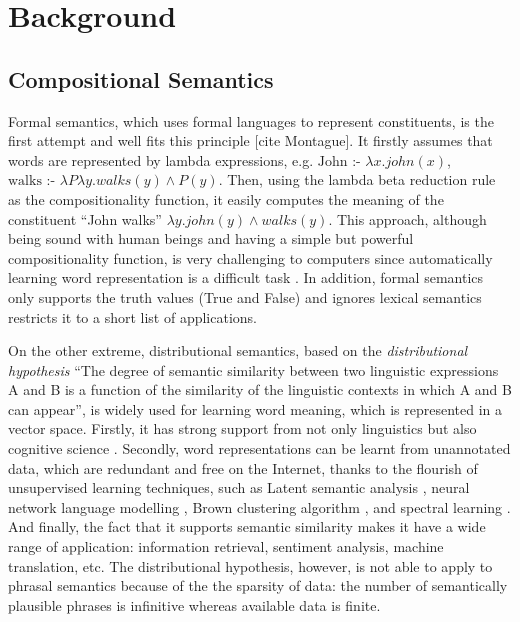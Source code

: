 \documentclass[11pt]{article}
\begin{document}

\section{Background}
\label{section background}

\subsection{Compositional Semantics}

Formal semantics, which uses formal languages to represent constituents, 
is the first attempt and well fits this principle [cite Montague].
It firstly assumes that 
words are represented by lambda expressions, e.g. $\text{John :- } \lambda x.john(x)$,
$\text{walks :- } \lambda P \lambda y. walks(y) \wedge P(y)$. Then, using  
the lambda beta reduction rule as the compositionality function, it easily  
computes the meaning of the constituent ``John walks'' 
$\lambda y. john(y) \wedge walks(y)$. 
This approach, although being sound with human beings and having a simple but 
powerful compositionality function, is very 
challenging to computers since automatically learning word representation 
is a difficult task \cite{DBLP:conf/coling/LeZ12}. 
In addition, formal semantics only supports the truth values (True and False) 
and ignores lexical semantics restricts it to a short list of applications.

On the other extreme, distributional semantics, based on 
the \textit{distributional hypothesis} \cite{lenci_distributional_2008}
``The degree of semantic similarity between two linguistic expressions A and B is a function
of the similarity of the linguistic contexts in which A and B can appear'',
is widely used for learning word meaning, which is represented in a vector space.
Firstly, it has strong support from not only linguistics but
also cognitive science \cite{lenci_distributional_2008}. Secondly, word representations 
can be learnt 
from unannotated data, which are redundant and free on the Internet, thanks to 
the flourish of unsupervised learning techniques, such as  Latent semantic analysis 
\cite{landauer1998introduction}, neural network 
language modelling \cite{collobert_natural_2011,huang2012improving}, Brown clustering
algorithm \cite{brown1992class}, and 
spectral learning \cite{dhillon2012two}. And finally, the fact that it supports 
semantic similarity makes it have a wide range of application: information retrieval,
sentiment analysis, machine translation, etc. 
The distributional hypothesis, however, is not able to apply to phrasal semantics 
because of the the sparsity of data: the number of semantically plausible phrases is 
infinitive whereas available data is finite.
\end{document}
